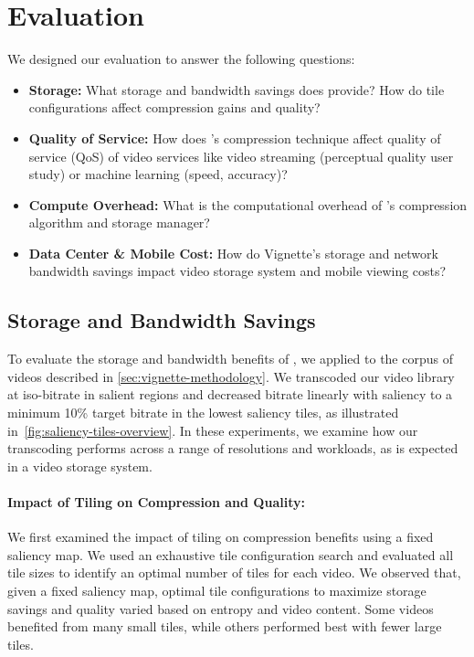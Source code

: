 

\section{Evaluation}
\label{sec:vignette-eval}

We designed our evaluation to answer the following questions:

\begin{itemize}
 \item \textbf{Storage:} What storage and bandwidth savings does \name provide? How do tile configurations affect compression gains and quality?
 \item \textbf{Quality of Service:} How does \name's compression technique affect quality of service (QoS) of video services like video streaming (perceptual quality user study) or machine learning (speed, accuracy)? %
 \item \textbf{Compute Overhead:} What is the computational overhead of \name's compression algorithm and storage manager?
 \item \textbf{Data Center \& Mobile Cost:} How do Vignette's storage and network bandwidth savings impact video storage system and mobile viewing costs?
\end{itemize}

\subsection{Storage and Bandwidth Savings}
\label{subsec:storage}
To evaluate the storage and bandwidth benefits of \name, we applied \nameCompress to the corpus of videos described in \ref{sec:vignette-methodology}.
We transcoded our video library at iso-bitrate in salient regions and decreased bitrate linearly with saliency to a minimum 10\% target bitrate in the lowest saliency tiles, as illustrated in~\ref{fig:saliency-tiles-overview}.
In these experiments, we examine how our transcoding performs across a range of resolutions and workloads, as is expected in a video storage system.


\paragraph{Impact of Tiling on Compression and Quality: } We first examined the impact of tiling on compression benefits using a fixed saliency map.
We used an exhaustive tile configuration search and evaluated all tile sizes to identify an optimal number of tiles for each video.
We observed that, given a fixed saliency map, optimal tile configurations to maximize storage savings and quality varied based on entropy and video content.
Some videos benefited from many small tiles, while others performed best with fewer large tiles.

